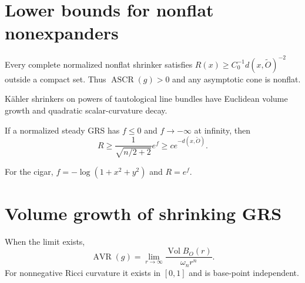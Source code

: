\section{Lower bounds for nonflat nonexpanders}

\begin{theorem}
\label{thm:chow-iv-shrinker-quadratic-lower}
Every complete normalized nonflat shrinker satisfies
$R(x)\ge C_0^{-1}d(x,\widetilde O)^{-2}$ outside a compact set.  Thus
$\operatorname{ASCR}(g)>0$ and any asymptotic cone is nonflat.
\end{theorem}

\begin{remark}
\label{rem:chow-iv-shrinker-quadratic-sharp}
K\"ahler shrinkers on powers of tautological line bundles have Euclidean volume
growth and quadratic scalar-curvature decay.
\end{remark}

\begin{theorem}
\label{thm:chow-iv-steady-exponential-lower}
If a normalized steady GRS has $f\le0$ and $f\to-\infty$ at infinity, then
\[
R\ge\frac{1}{\sqrt{n/2+2}}e^f\ge c e^{-d(x,\widetilde O)}.
\]
\end{theorem}

\begin{remark}
\label{rem:chow-iv-cigar}
For the cigar, $f=-\log(1+x^2+y^2)$ and $R=e^f$.
\end{remark}

\section{Volume growth of shrinking GRS}

\begin{definition}
\label{def:chow-iv-avr}
When the limit exists,
\[
\operatorname{AVR}(g)=\lim_{r\to\infty}
\frac{\operatorname{Vol}B_O(r)}{\omega_nr^n}.
\]
For nonnegative Ricci curvature it exists in $[0,1]$ and is base-point
independent.
\end{definition}

